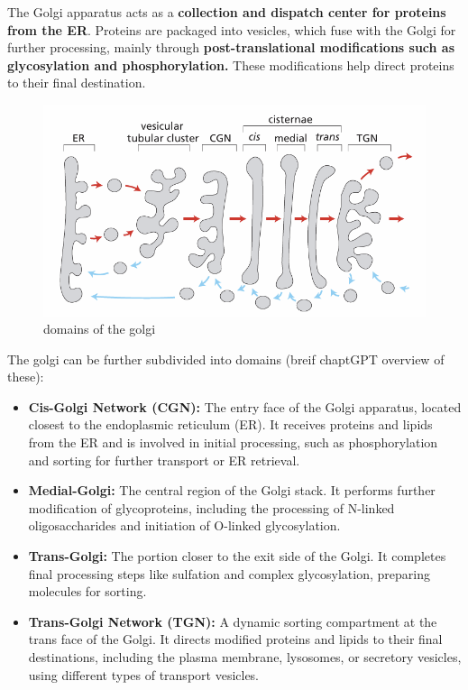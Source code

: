 \documentclass[../main.tex]{subfiles}
\begin{document}
The Golgi apparatus acts as a \textbf{collection and dispatch center for proteins from the ER}. Proteins are packaged into vesicles, which fuse with the Golgi for further processing, mainly through\textbf{ post-translational modifications such as glycosylation and phosphorylation.} These modifications help direct proteins to their final destination.
\begin{figure}[H]
    \centering
    \includegraphics[width=0.5\linewidth]{GolgiParts.png}
    \caption{domains of the golgi}
    \label{fig:enter-label}
\end{figure}
The golgi can be further subdivided into domains (breif chaptGPT overview of these):
\begin{itemize}
    \item \textbf{Cis-Golgi Network (CGN):} The entry face of the Golgi apparatus, located closest to the endoplasmic reticulum (ER). It receives proteins and lipids from the ER and is involved in initial processing, such as phosphorylation and sorting for further transport or ER retrieval.

    \item \textbf{Medial-Golgi:} The central region of the Golgi stack. It performs further modification of glycoproteins, including the processing of N-linked oligosaccharides and initiation of O-linked glycosylation.

    \item \textbf{Trans-Golgi:} The portion closer to the exit side of the Golgi. It completes final processing steps like sulfation and complex glycosylation, preparing molecules for sorting.

    \item \textbf{Trans-Golgi Network (TGN):} A dynamic sorting compartment at the trans face of the Golgi. It directs modified proteins and lipids to their final destinations, including the plasma membrane, lysosomes, or secretory vesicles, using different types of transport vesicles.
\end{itemize}
\end{document}
